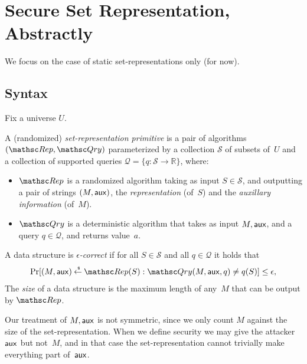 \section{Secure Set Representation, Abstractly}
We focus on the case of static set-representations only (for now).
\def\pub{{\sf pub}}
\def\aux{{\sf aux}}

\subsection{Syntax}
Fix a universe $U$.

\begin{definition} %
A (randomized) \emph{set-representation primitive} is a pair of algorithms $(\Rep, \Qry)$
parameterized by a collection $\mathcal{S}$ of subsets of~$U$ and a collection
of supported queries $\mathcal{Q}=\{q \colon \mathcal{S} \to \mathbb{R}\}$, where:
\begin{itemize}
\item $\Rep$ is a randomized algorithm taking as input $S \in \mathcal{S}$,
and outputting a pair of strings $(M,\aux)$, the \emph{representation} (of~$S$) and the \emph{auxillary information} (of~$M$).
\item $\Qry$ is a deterministic algorithm that takes as input $M, \aux$,
and a query $q\in \mathcal{Q}$, and returns value~$a$.
\end{itemize}
A data structure is \emph{$\epsilon$-correct} if for all $S \in \mathcal{S}$ and
all $q \in \mathcal{Q}$ it holds that
\begin{eqnarray}
\Pr[(M,\aux) \getsr \Rep(S) : \Qry(M, \aux, q) \neq q(S)] \leq \epsilon, \label{eqn:correctness}
\end{eqnarray}
The \emph{size} of a data structure is the maximum length of any~$M$ that can be
output by $\Rep$.
\end{definition}

Our treatment of $M,\aux$ is not symmetric, since we only count $M$ against the size
of the set-representation. When we define security
we may give the attacker $\aux$ but not~$M$, and in that case the set-representation cannot
trivially make everything part of~$\aux$. 

